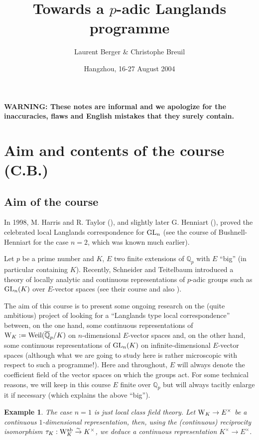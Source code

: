 \documentclass[11pt]{amsart}
\title{Towards a $p$-adic Langlands programme}
\author{Laurent Berger \& Christophe Breuil}
\date{Hangzhou, 16-27 August 2004}
\def\Q{{\mathbb Q}_p}
\newtheorem{ex}[definit]{\bf{Example}}
\begin{document}
 
 
\maketitle 
 
{\bf WARNING: These notes are informal and we apologize for the inaccuracies, flaws and English
  mistakes that they surely contain.} 
 
\setcounter{tocdepth}{2} 
\tableofcontents 
 
\section{Aim and contents of the course (C.B.)} 
 
\subsection{Aim of the course} 
In 1998, M. Harris and R. Taylor (\cite{HT}), and slightly later
G. Henniart (\cite{He}), proved the celebrated local Langlands
correspondence for ${\rm GL}_n$ (see the course of Bushnell-Henniart
for the case $n=2$, which was known much earlier).
 
Let $p$ be a prime number and $K$, $E$ two finite extensions of $\Q$
with $E$ ``big'' (in particular containing $K$). Recently, Schneider
and Teitelbaum introduced a theory of locally analytic and continuous
representations of $p$-adic groups such as ${\rm GL}_n(K)$ over
$E$-vector spaces (see their course and also \cite{Em2}).
 
The aim of this course is to present some ongoing research on the
(quite ambitious) project of looking for a ``Langlands type local
correspondence'' between, on the one hand, some continuous
representations of ${\rm W}_K:={\rm Weil}(\overline\Q/K)$ on
$n$-dimensional $E$-vector spaces and, on the other hand, some
continuous representations of ${\rm GL}_n(K)$ on infinite-dimensional
$E$-vector spaces (although what we are going to study here is rather
microscopic with respect to such a programme!). Here and throughout,
$E$ will always denote the coefficient field of the vector spaces on
which the groups act. For some technical reasons, we will keep in this
course $E$ finite over $\Q$ but will always tacitly enlarge it if
necessary (which explains the above ``big''). 
 
\begin{ex} 
The case $n=1$ is just local class field theory. Let ${\rm
  W}_K\rightarrow E^{\times}$ be a continuous $1$-dimensional
representation, then, using the (continuous) reciprocity isomorphism
$\tau_K:{\rm W}_K^{\rm ab}\buildrel\sim\over\rightarrow K^{\times}$,
we deduce a continuous representation $K^{\times}\rightarrow
E^{\times}$.  
\end{ex} 
 
\end{document}
